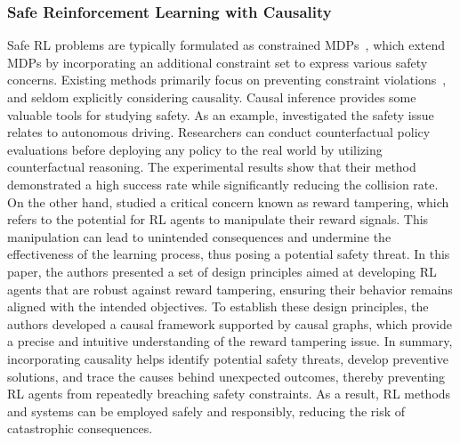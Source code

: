 \documentclass[10pt]{article} %
\theoremstyle{definition}
\begin{document}
\subsubsection{Safe Reinforcement Learning with Causality}
Safe RL problems are typically formulated as constrained MDPs~\citep{altmanConstrainedMarkovDecision1995,altmanConstrainedMarkovDecision1999}, which extend MDPs by incorporating an additional constraint set to express various safety concerns. Existing methods primarily focus on preventing constraint violations~\citep{achiamConstrainedPolicyOptimization2017, chowRiskconstrainedReinforcementLearning2017}, and seldom explicitly considering causality. 
Causal inference provides some valuable tools for studying safety. As an example, \citet{hartCounterfactualPolicyEvaluation2020a} investigated the safety issue relates to autonomous driving. Researchers can conduct counterfactual policy evaluations before deploying any policy to the real world by utilizing counterfactual reasoning. The experimental results show that their method demonstrated a high success rate while significantly reducing the collision rate. On the other hand, \citet{everittRewardTamperingProblems2021a} studied a critical concern known as reward tampering, which refers to the potential for RL agents to manipulate their reward signals. This manipulation can lead to unintended consequences and undermine the effectiveness of the learning process, thus posing a potential safety threat. In this paper, the authors presented a set of design principles aimed at developing RL agents that are robust against reward tampering, ensuring their behavior remains aligned with the intended objectives. To establish these design principles, the authors developed a causal framework supported by causal graphs, which provide a precise and intuitive understanding of the reward tampering issue. 
In summary, incorporating causality helps identify potential safety threats, develop preventive solutions, and trace the causes behind unexpected outcomes, thereby preventing RL agents from repeatedly breaching safety constraints. As a result, RL methods and systems can be employed safely and responsibly, reducing the risk of catastrophic consequences.
\end{document}
